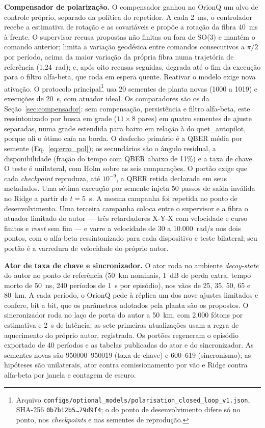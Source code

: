 \documentclass[12pt]{article}
\begin{document}
\textbf{Compensador de polarização.} O compensador ganhou no OrionQ um alvo de
controle próprio, separado da política do repetidor. A cada 2~ms, o controlador
recebe a estimativa de rotação e as covariáveis e propõe a rotação da fibra
40~ms à frente. O supervisor recusa propostas não finitas ou fora de SO(3) e
mantém o comando anterior; limita a variação geodésica entre comandos
consecutivos a $\pi/2$ por período, acima da maior variação da própria fibra
numa trajetória de referência (1,24~rad); e, após oito recusas seguidas, degrada
até o fim da execução para o filtro alfa-beta, que roda em espera quente.
Reativar o modelo exige nova ativação. O protocolo principal\footnote{Arquivo
\texttt{configs/optional\_models/polarisation\_closed\_loop\_v1.json}, SHA-256
\texttt{0b7b12b5\ldots{}79d9f4}; o do ponto de desenvolvimento difere só no ponto,
nos \textit{checkpoints} e nas sementes de reprodução.} usa 20 sementes de planta
novas (1000 a 1019) e execuções de 20~s, com atuador ideal. Os comparadores são
os da Seção~\ref{sec:compensador}: sem compensação, persistência e filtro
alfa-beta, este ressintonizado por busca em grade ($11\times8$ pares) em quatro
sementes de ajuste separadas, numa grade estendida para baixo em relação à do
qnet\_autopilot, porque ali o ótimo caía na borda. O desfecho primário é a QBER
média por semente (Eq.~\ref{eq:erro_pol}); os secundários são o ângulo residual,
a disponibilidade (fração do tempo com QBER abaixo de 11\%) e a taxa de chave.
O teste é unilateral, com Holm sobre as seis comparações. O portão exige que
cada \textit{checkpoint} reproduza, até $10^{-9}$, a QBER retida declarada em
seus metadados. Uma sétima execução por semente injeta 50 passos de saída
inválida no Ridge a partir de $t=5$~s. A mesma campanha foi repetida no ponto de
desenvolvimento. Uma terceira campanha coloca entre o supervisor e a fibra o
atuador limitado do autor --- três retardadores X-Y-X com velocidade e curso
finitos e \textit{reset} sem fim --- e varre a velocidade de 30 a
10.000~rad/s nos dois pontos, com o alfa-beta ressintonizado para cada
dispositivo e teste bilateral; seu portão é a varredura de velocidade do
próprio autor.

\textbf{Ator de taxa de chave e sincronizador.} O ator roda no ambiente
\textit{decoy-state} do autor no ponto de referência (50~km nominais, 1~dB de
perda extra, tempo morto de 50~ns, 240 períodos de 1~s por episódio), nos vãos
de 25, 35, 50, 65 e 80~km. A cada período, o OrionQ pede à réplica um dos nove
ajustes limitados e confere, bit a bit, que os parâmetros adotados pela planta
são os propostos. O sincronizador roda no laço de porta do autor a 50~km, com
2.000 fótons por estimativa e 2~s de latência; as sete primeiras atualizações
usam a regra de aquecimento do próprio autor, registrada. Os portões regeneram
o episódio exportado de 40 períodos e as tabelas publicadas do ator e do
sincronizador. As sementes novas são 950000--950019 (taxa de chave) e
600--619 (sincronismo); as hipóteses são unilaterais, ator contra comissionamento
por vão e Ridge contra alfa-beta por janela e contagem de escuro.
\end{document}
